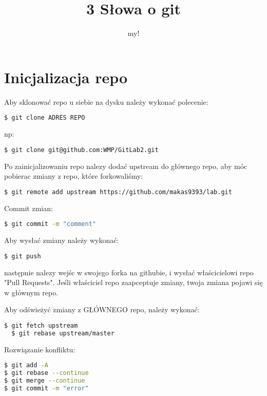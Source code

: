 \documentclass[12pt,a4paper]{book}
\author{my!}
\title{3 Słowa o git}
\begin{document}
\maketitle

\chapter{Inicjalizacja repo}
Aby sklonować repo u siebie na dysku należy wykonać polecenie:
\begin{lstlisting}[language=bash]
  $ git clone ADRES REPO
\end{lstlisting}
np:
\begin{lstlisting}[language=bash]
  $ git clone git@github.com:WMP/GitLab2.git
\end{lstlisting}
Po zainicjalizowaniu repo nalezy dodać upstream do głównego repo, aby móc pobierac zmiany z repo, które forkowaliśmy:
\begin{lstlisting}[language=bash]
  $ git remote add upstream https://github.com/makas9393/lab.git
\end{lstlisting}

Commit zmian:
\begin{lstlisting}[language=bash]
  $ git commit -m "comment"
\end{lstlisting}

Aby wysłać zmiany należy wykonać:
\begin{lstlisting}[language=bash]
  $ git push
\end{lstlisting}
następnie nalezy wejśc w swojego forka na githubie, i wysłać właścicielowi repo "Pull Requests". Jeśli właściciel repo zaapceptuje zmiany, twoja zmiana pojawi się w głównym repo. 

Aby odświeżyć zmiany z GŁÓWNEGO repo, należy wykonać:
\begin{lstlisting}[language=bash]
  $ git fetch upstream
  $ git rebase upstream/master
\end{lstlisting}


Rozwiązanie konfliktu:
\begin{lstlisting}[language=bash]
$ git add -A
$ git rebase --continue
$ git merge --continue
$ git commit -m "error"

\end{lstlisting}
\end{document}
